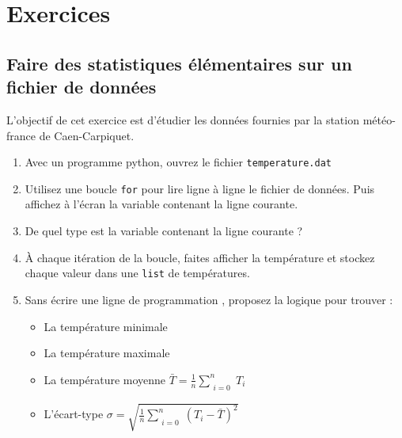 
\section{Exercices}

\subsection{Faire des statistiques élémentaires sur un fichier de données}

L'objectif de cet exercice est d'étudier les données fournies par la station météo-france
de Caen-Carpiquet.
\begin{enumerate}
\item Avec un programme python, ouvrez le fichier \texttt{temperature.dat}

\item Utilisez une boucle \texttt{for} pour lire ligne à ligne le fichier de données.
  Puis affichez à l'écran la variable contenant la ligne courante.

\item De quel type est la variable contenant la ligne courante ?


\item À chaque itération de la boucle, faites afficher la température et stockez chaque valeur dans une \texttt{list} de températures.

\item Sans écrire une ligne de programmation , proposez la logique pour trouver :
  \begin{itemize}
  \item La température minimale
  \item La température maximale
  \item La température moyenne    $ \bar{T}= \frac{1}{n}  \sum\limits_{\substack{i=0}}^{n}{T_i}$
  \item L'écart-type  $\sigma = \sqrt{\frac{1}{n}  \sum\limits_{\substack{i=0}}^{n}{} (T_i-\bar{T})^2   }$
  \end{itemize}


\end{enumerate}
